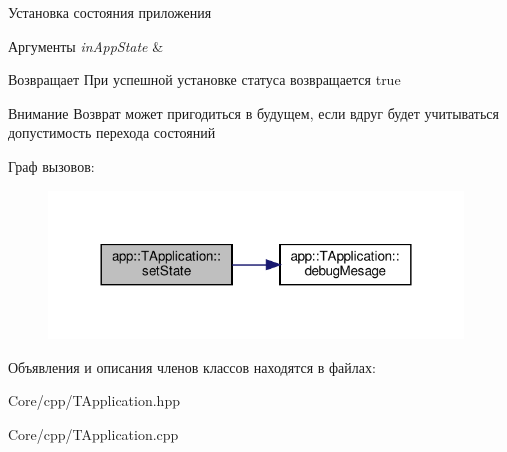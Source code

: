 Установка состояния приложения 


\begin{DoxyParams}{Аргументы}
{\em in\+App\+State} & \\
\hline
\end{DoxyParams}
\begin{DoxyReturn}{Возвращает}
При успешной установке статуса возвращается true 
\end{DoxyReturn}
\begin{DoxyAttention}{Внимание}
Возврат может пригодиться в будущем, если вдруг будет учитываться допустимость перехода состояний 
\end{DoxyAttention}
Граф вызовов\+:\nopagebreak
\begin{figure}[H]
\begin{center}
\leavevmode
\includegraphics[width=312pt]{classapp_1_1_t_application_a3df1835103a3ba338821c27ad05f9f8d_cgraph}
\end{center}
\end{figure}


Объявления и описания членов классов находятся в файлах\+:\begin{DoxyCompactItemize}
\item 
Core/cpp/T\+Application.\+hpp\item 
Core/cpp/T\+Application.\+cpp\end{DoxyCompactItemize}
